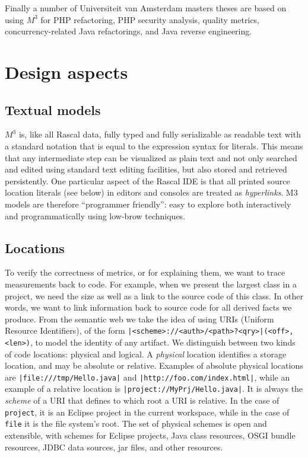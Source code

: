 \documentclass[conference]{IEEEtran}
\newcommand{\loc}[1]{\small{\texttt{#1}}\xspace}
\newcommand{\mthree}{\ensuremath{M^3}\xspace}
\begin{document}
Finally a number of Universiteit van Amsterdam masters theses are based on
using \mthree for PHP refactoring, PHP security analysis, quality metrics,
concurrency-related Java refactorings, and Java reverse engineering.

\section{Design aspects}

\subsection{Textual models}

\mthree is, like all Rascal data, fully typed and fully serializable as
readable text with a standard notation that is equal to the expression syntax
for literals. This means that any intermediate step can be visualized as plain
text and not only searched and edited using standard text editing facilities,
but also stored and retrieved persistently. One particular aspect of the
Rascal IDE is that all printed source location literals (see below) in editors
and consoles are treated as \emph{hyperlinks}. M3 models are therefore
``programmer friendly'': easy to explore both interactively and
programmatically using low-brow techniques.

\subsection{Locations} 

To verify the correctness of metrics, or for explaining them, we want to trace
measurements back to code. For example, when we present the largest class in a
project, we need the size as well as a link to the source code of this class.
In other words, we want to link information back to source code for all
derived facts we produce. From the semantic web we take the idea of using URIs
(Uniform Resource Identifiers), of the form 
\loc{|<scheme>://<auth>/<path>?<qry>|(<off>,<len>)}, 
to model the identity of any artifact. We
distinguish between two kinds of code locations: physical and logical. A
\emph{physical} location identifies a storage location, and may be absolute or
relative. Examples of absolute physical locations are
\loc{|file:///tmp/Hello.java|} and \loc{|http://foo.com/index.html|}, while an
example of a relative location is \loc{|project://MyPrj/Hello.java|}. It is always the
\emph{scheme} of a URI that defines to
which root a URI is relative. In the case of \texttt{project}, it is an
Eclipse project in the current workspace, while in the case of \texttt{file}
it is the file system's root. The set of physical schemes is open and
extensible, with schemes for Eclipse projects, Java class resources, OSGI
bundle resources, JDBC data sources, jar files, and other resources.
\end{document}
